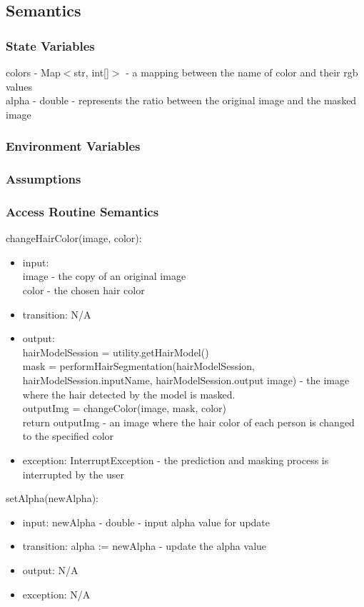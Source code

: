 \documentclass[12pt, titlepage]{article}
\begin{document}
\subsection{Semantics}

\subsubsection{State Variables}
colors - Map$<$str, int[]$>$ - a mapping between the name of color and their rgb values \\
alpha - double - represents the ratio between the original image and the masked image

\subsubsection{Environment Variables}

\subsubsection{Assumptions}

\subsubsection{Access Routine Semantics}

\noindent changeHairColor(image, color):
\begin{itemize}
\item input: \\ image - the copy of an original image \\ color - the chosen hair color
\item transition: N/A
\item output:\\
hairModelSession = utility.getHairModel() \\
mask = performHairSegmentation(hairModelSession, hairModelSession.inputName, hairModelSession.output image) - the image where the hair detected by the model is masked. \\
outputImg = changeColor(image, mask, color) \\
return outputImg - an image where the hair color of each person is changed to the specified color
\item exception: InterruptException - the prediction and masking process is interrupted by the user
\end{itemize}

\noindent setAlpha(newAlpha):
\begin{itemize}
\item input: newAlpha - double - input alpha value for update
\item transition: alpha := newAlpha - update the alpha value
\item output: N/A
\item exception: N/A
\end{itemize}
\end{document}
